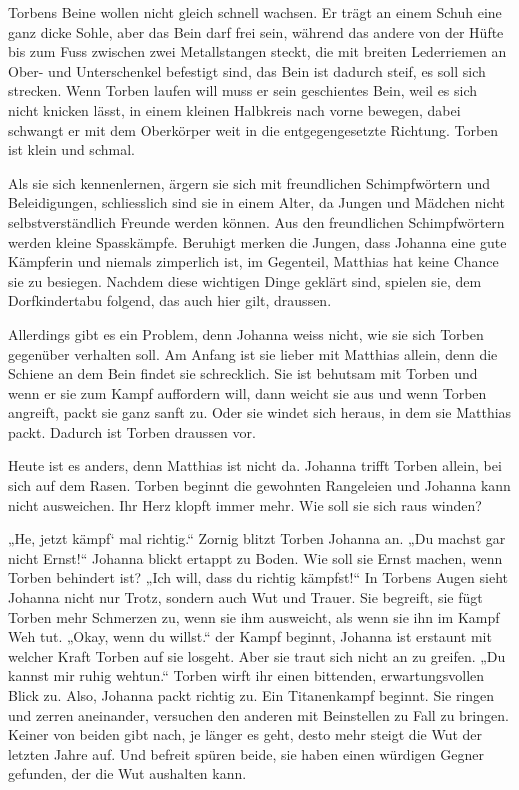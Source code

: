 \documentclass[10pt,titlepage,a5paper]{book}
\begin{document}
Torbens Beine wollen nicht gleich schnell wachsen. Er trägt an einem Schuh eine ganz dicke Sohle, aber das Bein darf frei sein, währ\-end das andere von der Hüfte bis zum Fuss zwischen zwei Metallstangen steckt, die mit breiten Lederriemen an Ober- und Unterschenkel befestigt sind, das Bein ist dadurch steif, es soll sich strecken. Wenn Torben laufen will muss er sein geschientes Bein, weil es sich nicht knicken lässt, in einem kleinen Halbkreis nach vorne bewegen, dabei schwangt er mit dem Oberkörper weit in die entgegengesetzte Richtung. Torben ist klein und schmal. 

Als sie sich kennenlernen, ärgern sie sich mit freundlichen Schimpf\-wörtern und Beleidigungen, schliesslich sind sie in einem Alter, da Jungen und Mädchen nicht selbstverständlich Freunde werden können. Aus den freundlichen Schimpf\-wörtern werden kleine Sp\-ass\-kämpfe. Beruhigt merken die Jungen, dass Johanna eine gute Käm\-pferin und niemals zimperlich ist, im Gegenteil, Matthias hat keine Chance sie zu besiegen. Nachdem diese wichtigen Dinge geklärt sind, spielen sie, dem Dorfkindertabu folgend, das auch hier gilt, draussen. 

Allerdings gibt es ein Problem, denn Johanna weiss nicht, wie sie sich Torben gegenüber verhalten soll. Am Anfang ist sie lieber mit Matthias allein, denn die Schiene an dem Bein findet sie schrecklich. Sie ist behutsam mit Torben und wenn er sie zum Kampf auffordern will, dann weicht sie aus und wenn Torben angreift, packt sie ganz sanft zu. Oder sie windet sich heraus, in dem sie Matthias packt. Dadurch ist Torben draussen vor.

Heute ist es anders, denn Matthias ist nicht da. Johanna trifft Torben allein, bei sich auf dem Rasen. Torben beginnt die gewohnten Rangeleien und Johanna kann nicht ausweichen. Ihr Herz klopft immer mehr. Wie soll sie sich raus winden? 

„He, jetzt kämpf` mal richtig.“ Zornig blitzt Torben Johanna an. „Du machst gar nicht Ernst!“ Johanna blickt ertappt zu Boden. Wie soll sie Ernst machen, wenn Torben behindert ist? „Ich will, dass du richtig kämpfst!“ In Torbens Augen sieht Johanna nicht nur Trotz, sondern auch Wut und Trauer. Sie begreift, sie fügt Torben mehr Schmerzen zu, wenn sie ihm ausweicht, als wenn sie ihn im Kampf Weh tut. „Okay, wenn du willst.“ der Kampf beginnt, Johanna ist erstaunt mit welcher Kraft Torben auf sie losgeht. Aber sie traut sich nicht an zu greifen. „Du kannst mir ruhig wehtun.“ Torben wirft ihr einen bittenden, erwartungsvollen Blick zu. Also, Johanna packt richtig zu. Ein Titanenkampf beginnt. Sie ringen und zerren aneinander, versuchen den anderen mit Beinstellen zu Fall zu bringen. Keiner von beiden gibt nach, je länger es geht, desto mehr steigt die Wut der letzten Jahre auf. Und befreit spüren beide, sie haben einen würdigen Gegner gefunden, der die Wut aushalten kann.
\end{document}
